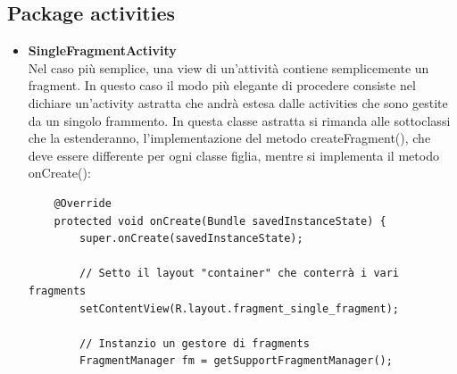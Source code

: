 \documentclass{article}
\begin{document}
\subsection{Package activities}
\begin{itemize} 
    \item \textbf{SingleFragmentActivity} \\
    Nel caso più semplice, una view di un’attività contiene semplicemente un fragment. In questo caso il modo più elegante di procedere
    consiste nel dichiare un'activity astratta che andrà estesa dalle activities che sono gestite da un singolo frammento.
    In questa classe astratta si rimanda alle sottoclassi che la estenderanno, l'implementazione del metodo createFragment(), che deve essere
    differente per ogni classe figlia, mentre si implementa il metodo onCreate():
    \begin{lstlisting}
    @Override
    protected void onCreate(Bundle savedInstanceState) {
        super.onCreate(savedInstanceState);

        // Setto il layout "container" che conterrà i vari fragments
        setContentView(R.layout.fragment_single_fragment);

        // Instanzio un gestore di fragments
        FragmentManager fm = getSupportFragmentManager();


\end{lstlisting}
\end{itemize}
\end{document}
